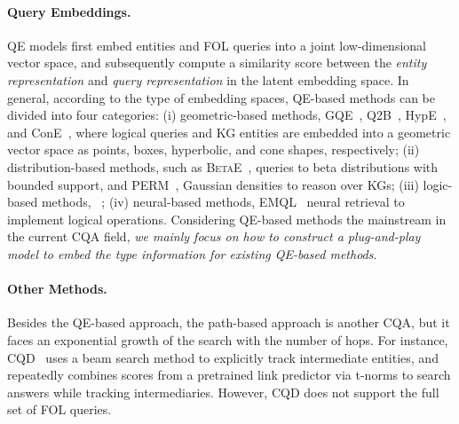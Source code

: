 \paragraph{Query Embeddings.} QE models first embed entities and FOL queries into a joint low-dimensional vector space, and subsequently compute a similarity score between the \emph{entity representation} and \emph{query representation} in the latent embedding space. In general, according to the type of embedding spaces, QE-based methods can be divided into four categories: (i) geometric-based methods,  GQE~\cite{hamilton2018embedding}, Q2B~\cite{query2box:ren2020}, HypE~\cite{choudhary2021self}, and ConE~\cite{zhang2021cone}, where logical queries and KG entities are embedded into a geometric vector space as points, boxes, hyperbolic, and cone shapes, respectively; (ii) distribution-based methods, such as \textsc{BetaE}~\cite{ren2020beta},  queries to beta distributions with bounded support, and PERM~\cite{choudhary2021probabilistic},  Gaussian densities to reason over KGs; 
(iii) logic-based methods, 
~\cite{luus2021logic}; (iv) neural-based methods,  EMQL~\cite{sun2020faithful}  neural retrieval to implement logical operations. 
Considering QE-based methods  the mainstream  in the current CQA field, \textit{we mainly focus on how to construct a plug-and-play model to embed the type information for existing QE-based methods}.  

\paragraph{Other Methods.} Besides the QE-based approach, the path-based approach is another  CQA, but it faces an exponential growth of the search  with the number of hops. For instance, CQD~\cite{arakelyan2020complex} uses a beam search method to explicitly track intermediate entities, and repeatedly combines scores from a pretrained link predictor via t-norms  to search answers while tracking intermediaries. However, CQD does not support the full set of FOL queries. %


